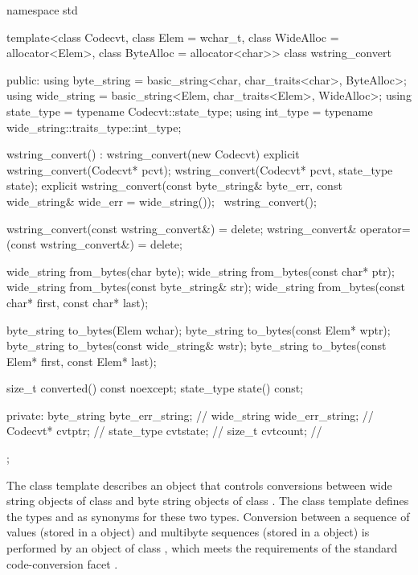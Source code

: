 %
%
%
%
%
\begin{codeblock}
namespace std {
  template<class Codecvt, class Elem = wchar_t,
           class WideAlloc = allocator<Elem>,
           class ByteAlloc = allocator<char>>
    class wstring_convert {
    public:
      using byte_string = basic_string<char, char_traits<char>, ByteAlloc>;
      using wide_string = basic_string<Elem, char_traits<Elem>, WideAlloc>;
      using state_type  = typename Codecvt::state_type;
      using int_type    = typename wide_string::traits_type::int_type;

      wstring_convert() : wstring_convert(new Codecvt) {}
      explicit wstring_convert(Codecvt* pcvt);
      wstring_convert(Codecvt* pcvt, state_type state);
      explicit wstring_convert(const byte_string& byte_err,
                               const wide_string& wide_err = wide_string());
      ~wstring_convert();

      wstring_convert(const wstring_convert&) = delete;
      wstring_convert& operator=(const wstring_convert&) = delete;

      wide_string from_bytes(char byte);
      wide_string from_bytes(const char* ptr);
      wide_string from_bytes(const byte_string& str);
      wide_string from_bytes(const char* first, const char* last);

      byte_string to_bytes(Elem wchar);
      byte_string to_bytes(const Elem* wptr);
      byte_string to_bytes(const wide_string& wstr);
      byte_string to_bytes(const Elem* first, const Elem* last);

      size_t converted() const noexcept;
      state_type state() const;

    private:
      byte_string byte_err_string;  // \expos
      wide_string wide_err_string;  // \expos
      Codecvt* cvtptr;              // \expos
      state_type cvtstate;          // \expos
      size_t cvtcount;              // \expos
    };
}
\end{codeblock}

\pnum
The class template describes an object that controls conversions between wide
string objects of class  and byte string objects of class . The class template defines the types
 and  as synonyms for these two types.
Conversion between a sequence of  values (stored in a
 object) and multibyte sequences (stored in a
 object) is performed by an object of class
, which meets the
requirements of the standard code-conversion facet .


